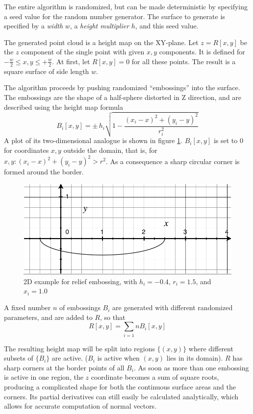 The entire algorithm is randomized, but can be made deterministic by specifying a seed value for the random number generator. The surface to generate is specified by a \emph{width} $w$, a \emph{height multiplier} $h$, and this seed value.

The generated point cloud is a height map on the XY-plane. Let $z = R[x,y]$ be the $z$ component of the single point with given $x, y$ components. It is defined for $-\frac{w}{2} \leq x,y \leq +\frac{w}{2}$. At first, let $R[x,y] = 0$ for all these points. The result is a square surface of side length $w$.

The algorithm proceeds by pushing randomized ``embossings'' into the surface. The embossings are the shape of a half-sphere distorted in Z direction, and are described using the height map formula
\begin{equation}
B_i[x,y] = \pm \, h_i \sqrt{1 - \frac{(x_i - x)^2 + (y_i - y)^2}{r_i^2}}
\end{equation}
A plot of its two-dimensional analogue is shown in figure \ref{fig:relief_B}. $B_i[x,y]$ is set to $0$ for coordinates $x,y$ outside the domain, that is, for $x,y : (x_i - x)^2 + (y_i - y)^2 > r^2$. As a consequence a sharp circular corner is formed around the border.

\begin{figure}[h]
\centering
\includegraphics[width=.4\textwidth]{fig/relief_B.pdf}
\caption{2D example for relief embossing, with $h_i = -0.4$, $r_i = 1.5$, and $x_i = 1.0$}
\label{fig:relief_B}
\end{figure}

A fixed number $n$ of embossings $B_i$ are generated with different randomized parameters, and are added to $R$, so that
\begin{equation}
R[x,y] = \sum_{i=1}{n} B_i[x,y]
\end{equation}

The resulting height map will be split into regions $\{(x,y)\}$ where different subsets of $\{B_i\}$ are active. ($B_i$ is active when $(x,y)$ lies in its domain). $R$ has sharp corners at the border points of all $B_i$. As soon as more than one embossing is active in one region, the $z$ coordinate becomes a sum of square roots, producing a complicated shape for both the continuous surface areas and the corners. Its partial derivatives can still easily be calculated analytically, which allows for accurate computation of normal vectors. 

